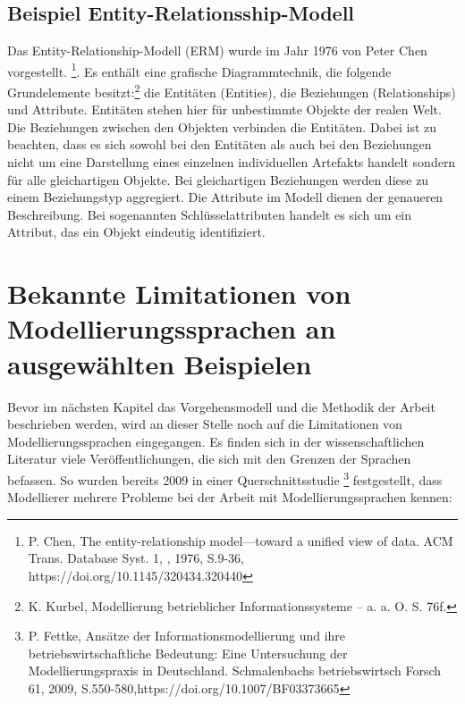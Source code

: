 \subsection{Beispiel Entity-Relationsship-Modell}

Das Entity-Relationship-Modell (ERM) wurde im Jahr 1976 von Peter Chen vorgestellt. \footnote {P. Chen, The entity-relationship model—toward a unified view of data. ACM Trans. Database Syst. 1, , 1976, S.9-36, https://doi.org/10.1145/320434.320440 }. Es enthält eine grafische Diagrammtechnik, die folgende Grundelemente besitzt:\footnote{K. Kurbel, Modellierung betrieblicher Informationssysteme – a. a. O. S. 76f.} die Entitäten (Entities), die Beziehungen (Relationships) und Attribute. Entitäten stehen hier für unbestimmte Objekte der realen Welt. Die Beziehungen zwischen den Objekten verbinden die Entitäten. Dabei ist zu beachten, dass es sich sowohl bei den Entitäten als auch bei den Beziehungen nicht um eine Darstellung eines einzelnen individuellen Artefakts handelt sondern für alle gleichartigen Objekte. Bei gleichartigen Beziehungen werden diese zu einem Beziehungstyp aggregiert. Die Attribute im Modell dienen der genaueren Beschreibung. Bei sogenannten Schlüsselattributen handelt es sich um ein Attribut, das ein  Objekt eindeutig identifiziert.

\section{Bekannte Limitationen von Modellierungssprachen an ausgewählten Beispielen}

Bevor im nächsten Kapitel das Vorgehensmodell und die  Methodik der Arbeit beschrieben werden, wird an dieser Stelle noch auf die Limitationen von Modellierungssprachen eingegangen. Es finden sich in der wissenschaftlichen Literatur viele Veröffentlichungen, die sich mit den Grenzen der Sprachen befassen. So wurden bereits 2009 in einer Querschnittsstudie \footnote{P. Fettke, Ansätze der Informationsmodellierung und ihre betriebswirtschaftliche Bedeutung: Eine Untersuchung der Modellierungspraxis in Deutschland. Schmalenbachs betriebswirtsch Forsch 61, 2009, S.550-580,https://doi.org/10.1007/BF03373665} festgestellt, dass Modellierer mehrere Probleme bei der Arbeit mit Modellierungssprachen kennen:

